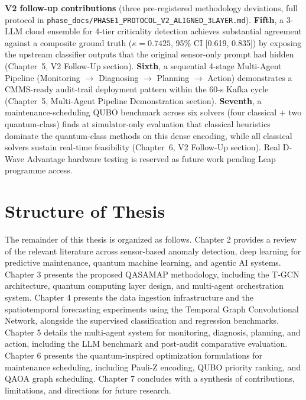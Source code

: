 \textbf{V2 follow-up contributions} (three pre-registered methodology deviations, full protocol in \texttt{phase\_docs/PHASE1\_PROTOCOL\_V2\_ALIGNED\_3LAYER.md}). \textbf{Fifth}, a 3-LLM cloud ensemble for 4-tier criticality detection achieves substantial agreement against a composite ground truth ($\kappa = 0.7425$, 95\% CI [0.619, 0.835]) by exposing the upstream classifier outputs that the original sensor-only prompt had hidden (Chapter~5, V2 Follow-Up section). \textbf{Sixth}, a sequential 4-stage Multi-Agent Pipeline (Monitoring $\to$ Diagnosing $\to$ Planning $\to$ Action) demonstrates a CMMS-ready audit-trail deployment pattern within the 60-s Kafka cycle (Chapter~5, Multi-Agent Pipeline Demonstration section). \textbf{Seventh}, a maintenance-scheduling QUBO benchmark across six solvers (four classical + two quantum-class) finds at simulator-only evaluation that classical heuristics dominate the quantum-class methods on this dense encoding, while all classical solvers sustain real-time feasibility (Chapter~6, V2 Follow-Up section). Real D-Wave Advantage hardware testing is reserved as future work pending Leap programme access.

\section{Structure of Thesis}

The remainder of this thesis is organized as follows. Chapter 2 provides a review of the relevant literature across sensor-based anomaly detection, deep learning for predictive maintenance, quantum machine learning, and agentic AI systems. Chapter 3 presents the proposed QASAMAP methodology, including the T-GCN architecture, quantum computing layer design, and multi-agent orchestration system. Chapter 4 presents the data ingestion infrastructure and the spatiotemporal forecasting experiments using the Temporal Graph Convolutional Network, alongside the supervised classification and regression benchmarks. Chapter 5 details the multi-agent system for monitoring, diagnosis, planning, and action, including the LLM benchmark and post-audit comparative evaluation. Chapter 6 presents the quantum-inspired optimization formulations for maintenance scheduling, including Pauli-Z encoding, QUBO priority ranking, and QAOA graph scheduling. Chapter 7 concludes with a synthesis of contributions, limitations, and directions for future research.
